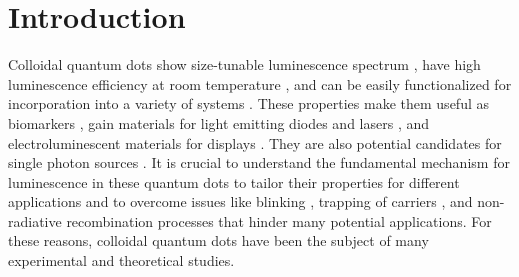 \documentclass[aps,pra,preprint,groupedaddress]{revtex4-1}
\begin{document}
\section*{Introduction}
Colloidal quantum dots show size-tunable luminescence spectrum \cite{Alivisatos1996, Klimov2003}, have high luminescence efficiency at room temperature \cite{Lee2000, Qu2002}, and can be easily functionalized for incorporation into a variety of systems \cite{DeMelloDonega2011}. These properties make them useful as biomarkers \cite{BruchezJr.1998}, gain materials for light emitting diodes \cite{Mashford2013, Qian2011} and lasers \cite{Min2006, Eisler2002}, and electroluminescent materials for displays \cite{Coe2002}. They are also potential candidates for single photon sources \cite{Brokmann2004a}.  
It is crucial to understand the fundamental mechanism for luminescence in these quantum dots to tailor their properties for different applications and to overcome issues like blinking \cite{Nirmal1996}, trapping of carriers \cite{Jones2003}, and non-radiative recombination processes \cite{Klimov2000} that hinder many potential applications. For these reasons, colloidal quantum dots have been the subject of many experimental \cite{Klimov2007b, Califano2005, Crooker2003, Biadala2009, Brokmann2004b,Fushman2005,Rakher2010,Rakher2011,Di2012,Gesuele2012,Gupta2013, Oron2009, Eilers2014, Biadala2016, Robel2015, Talapin2003, Talapin2004,Makarov2014,Choi2012, Kagan1996} and theoretical \cite{Efros1996, Leung1998, Franceschetti1999, Gupta2014, Rodina2015, Rodina2016, Manjavacas2011} studies.

\end{document}
